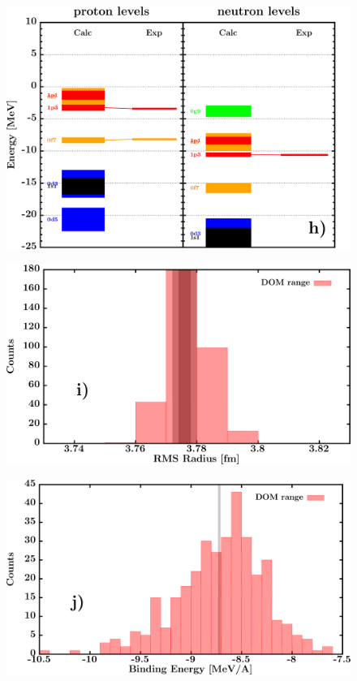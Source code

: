 \documentclass[twocolumn,secnumarabic,amssymb, nobibnotes, aps, prl,
superscriptaddress, nobalancelastpage, draft]{revtex4}
\begin{document}
\begin{figure}[!htb]
\begin{minipage}{0.4\linewidth}
        \label{DOM_ni58_chargeDensity}
    \end{minipage}\hspace{6pt}
    \begin{minipage}{0.4\linewidth}
        \centering
        \includegraphics[width=\linewidth]{figures/ni58_SPLevels.png}
        \label{DOM_ni58_SPLevels}
    \end{minipage}
    \begin{minipage}{0.4\linewidth}
        \centering
        \includegraphics[width=\linewidth]{figures/ni58_RMSRadius.png}
        \label{DOM_ni58_RMSRadius}
    \end{minipage}\hspace{6pt}
    \begin{minipage}{0.4\linewidth}
        \centering
        \includegraphics[width=\linewidth]{figures/ni58_BE.png}

\end{minipage}
\end{figure}
\end{document}
